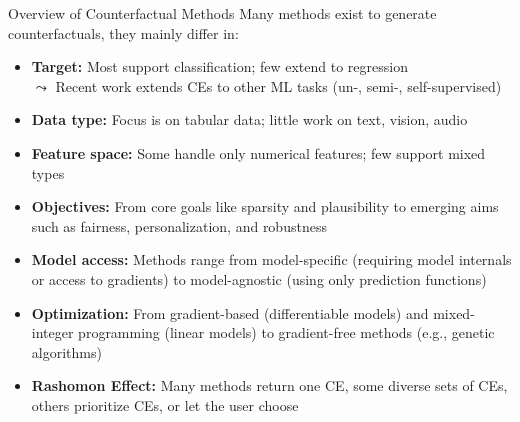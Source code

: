 \documentclass[10pt,compress,t,notes=noshow, xcolor=table]{beamer}
\begin{document}
\begin{frame}{Overview of Counterfactual Methods}
Many methods exist to generate counterfactuals, they mainly differ in:
    
	\begin{itemize}[<+->]
		  \item \textbf{Target:} Most support classification; few extend to regression\\
  $\leadsto$ Recent work extends CEs to other ML tasks (un-, semi-, self-supervised)
 \item \textbf{Data type:} Focus is on tabular data; little work on text, vision, audio
		\item \textbf{Feature space:}  Some handle only numerical features; few support mixed types
		\item \textbf{Objectives:} 
        From core goals like sparsity and plausibility to emerging aims such as fairness, personalization, and robustness
		\item \textbf{Model access:} 
        Methods range from model-specific (requiring model internals or access to gradients) to model-agnostic (using only prediction functions)
		 \item \textbf{Optimization:} 
         From gradient-based (differentiable models) and mixed-integer programming (linear models) to gradient-free methods (e.g., genetic algorithms)
		\item \textbf{Rashomon Effect:} Many methods return one CE, some diverse sets of CEs, others prioritize CEs, or let the user choose
	\end{itemize}
\end{frame}
\end{document}
